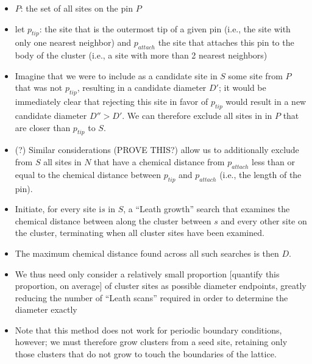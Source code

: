 \documentclass[11pt]{article}
\begin{document}
\begin{itemize}
\begin{itemize}
\item $P$: the set of all sites on the pin $P$\\
\label{sec-5-2-4-5-1}%
\item let $p_{tip}$: the site that is the outermost tip of a given pin (i.e., the site with only one nearest neighbor) and $p_{attach}$ the site that attaches this pin to the body of the cluster (i.e., a site with more than 2 nearest neighbors)\\
\label{sec-5-2-4-5-2}%
\item Imagine that we were to include as a candidate site in $S$ some site from $P$ that was not $p_{tip}$, resulting in a candidate diameter $D'$; it would be immediately clear that rejecting this site in favor of $p_{tip}$ would result in a new candidate diameter $D''>D'$.  We can therefore exclude all sites in in $P$ that are closer than $p_{tip}$ to $S$.\\
\label{sec-5-2-4-5-3}%
\item (?) Similar considerations (PROVE THIS?) allow us to additionally exclude from $S$ all sites in $N$ that have a chemical distance from $p_{attach}$ less than or equal to the chemical distance between $p_{tip}$ and $p_{attach}$ (i.e., the length of the pin).\\
\label{sec-5-2-4-5-4}%
\item Initiate, for every site i$s$ in $S$, a ``Leath growth'' search that examines the chemical distance between along the cluster between $s$ and every other site on the cluster, terminating when all cluster sites have been examined.\\
\label{sec-5-2-4-5-5}%
\item The maximum chemical distance found across all such searches is then $D$.\\
\label{sec-5-2-4-5-6}%
\item We thus need only consider a relatively small proportion [quantify this proportion, on average] of cluster sites as possible diameter endpoints, greatly reducing the number of ``Leath scans'' required in order to determine the diameter exactly\\
\label{sec-5-2-4-5-7}%
\item Note that this method does not work for periodic boundary conditions, however; we must therefore grow clusters from a seed site, retaining only those clusters that do not grow to touch the boundaries of the lattice.\\
\label{sec-5-2-4-5-8}%
\end{itemize} %


\end{itemize}
\end{document}
